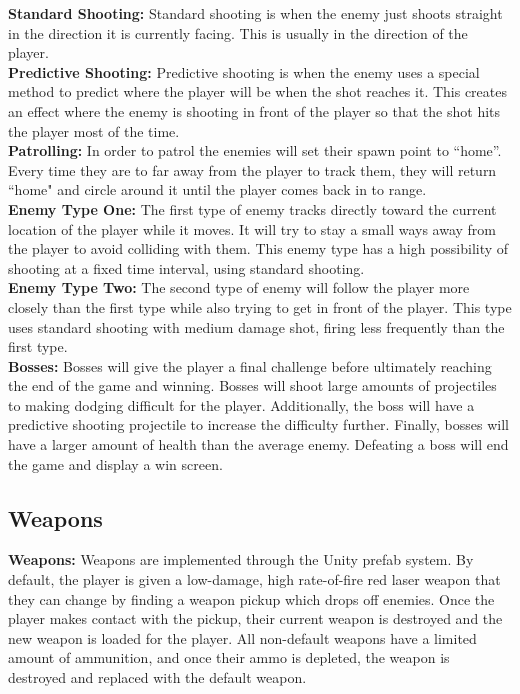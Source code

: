 \documentclass[12pt]{article}       %
\begin{document}
	{\bf Standard Shooting:} Standard shooting is when the enemy just shoots straight in the direction it is currently facing.  This is usually in the direction of the player. \\

	{\bf Predictive Shooting:} Predictive shooting is when the enemy uses a special method to predict where the player will be when the shot reaches it. This creates an effect where the enemy is shooting in front of the player so that the shot hits the player most of the time. \\

	{\bf Patrolling:} In order to patrol the enemies will set their spawn point to ``home''. Every time they are to far away from the player to track them, they will return ``home" and circle around it until the player comes back in to range. \\

	{\bf Enemy Type One:} The first type of enemy tracks directly toward the current location of the player while it moves. It will try to stay a small ways away from the player to avoid colliding with them. This enemy type has a high possibility of shooting at a fixed time interval, using standard shooting. \\

	{\bf Enemy Type Two:} The second type of enemy will follow the player more closely than the first type while also trying to get in front of the player. This type uses standard shooting with medium damage shot, firing less frequently than the first type. \\

	{\bf Bosses:} Bosses will give the player a final challenge before ultimately reaching the end of the game and winning. Bosses will shoot large amounts of projectiles to making dodging difficult for the player. Additionally, the boss will have a predictive shooting projectile to increase the difficulty further. Finally, bosses will have a larger amount of health than the average enemy. Defeating a boss will end the game and display a win screen. \\

\subsection{Weapons} %

	{\bf Weapons:} Weapons are implemented through the Unity prefab system. By default, the player is given a low-damage, high rate-of-fire red laser weapon that they can change by finding a weapon pickup which drops off enemies. Once the player makes contact with the pickup, their current weapon is destroyed and the new weapon is loaded for the player. All non-default weapons have a limited amount of ammunition, and once their ammo is depleted, the weapon is destroyed and replaced with the default weapon.
\end{document}
